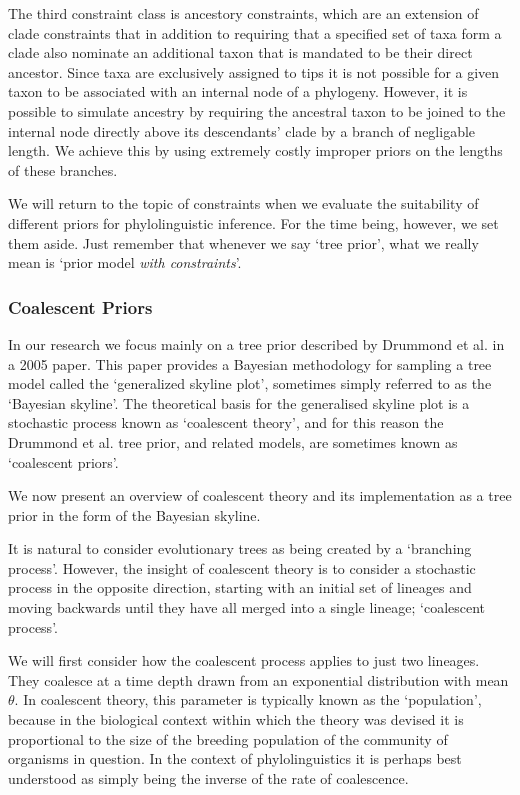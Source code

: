\documentclass[10pt,journal,compsoc]{IEEEtran}
\begin{document}
The third constraint class is ancestory constraints, which are an extension of clade constraints that in addition to requiring that a specified set of taxa form a clade also nominate an additional taxon that is mandated to be their direct ancestor. Since taxa are exclusively assigned to tips it is not possible for a given taxon to be associated with an internal node of a phylogeny. However, it is possible to simulate ancestry by requiring the ancestral taxon to be joined to the internal node directly above its descendants' clade by a branch of negligable length. We achieve this by using extremely costly improper priors on the lengths of these branches.

We will return to the topic of constraints when we evaluate the suitability of different priors for phylolinguistic inference. For the time being, however, we set them aside. Just remember that whenever we say `tree prior', what we really mean is `prior model \textit{with constraints}'.

\subsubsection{Coalescent Priors}

In our research we focus mainly on a tree prior described by Drummond et al. in a 2005 paper. This paper provides a Bayesian methodology for sampling a tree model called the `generalized skyline plot', sometimes simply referred to as the `Bayesian skyline'. The theoretical basis for the generalised skyline plot is a stochastic process known as `coalescent theory', and for this reason the Drummond et al. tree prior, and related models, are sometimes known as `coalescent priors'.

We now present an overview of coalescent theory and its implementation as a tree prior in the form of the Bayesian skyline.

It is natural to consider evolutionary trees as being created by a `branching process'. However, the insight of coalescent theory is to consider a stochastic process in the opposite direction, starting with an initial set of lineages and moving backwards until they have all merged into a single lineage;  `coalescent process'.

We will first consider how the coalescent process applies to just two lineages. They coalesce at a time depth drawn from an exponential distribution with mean $\theta$. In coalescent theory, this parameter is typically known as the `population', because in the biological context within which the theory was devised it is proportional to the size of the breeding population of the community of organisms in question. In the context of phylolinguistics it is perhaps best understood as simply being the inverse of the rate of coalescence.
\end{document}

